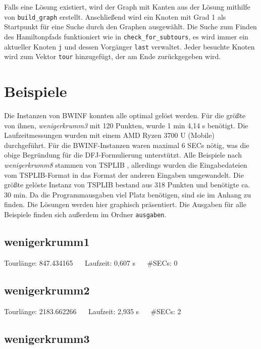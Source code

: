 \documentclass[a4paper, 10pt, ngerman]{article}
\begin{document}
Falls eine Lösung existiert, wird der Graph mit Kanten aus der Lösung mithilfe von \verb|build_graph| erstellt. Anschließend wird ein Knoten mit Grad 1 als Startpunkt für eine Suche durch den Graphen ausgewählt. Die Suche zum Finden des Hamiltonpfads funktioniert wie in \verb|check_for_subtours|, es wird immer ein aktueller Knoten \verb|j| und dessen Vorgänger \verb|last| verwaltet. Jeder besuchte Knoten wird zum Vektor \verb|tour| hinzugefügt, der am Ende zurückgegeben wird.

\section{Beispiele}

Die Instanzen von BWINF konnten alle optimal gelöst werden. Für die größte von ihnen, \emph{wenigerkrumm3} mit 120 Punkten, wurde 1 min 4,14 s benötigt. Die Laufzeitmessungen wurden mit einem AMD Ryzen 3700 U (Mobile) durchgeführt. Für die BWINF-Instanzen waren maximal 6 SECs nötig, was die obige Begründung für die DFJ-Formulierung unterstützt. Alle Beispiele nach \emph{wenigerkrumm8} stammen von TSPLIB \cite{tsplib}, allerdings wurden die Eingabedateien vom TSPLIB-Format in das Format der anderen Eingaben umgewandelt. Die größte gelöste Instanz von TSPLIB bestand aus 318 Punkten und benötigte ca. 30 min. Da die Programmausgaben viel Platz benötigen, sind sie im Anhang zu finden. Die Lösungen werden hier graphisch präsentiert. Die Ausgaben für alle Beispiele finden sich außerdem im Ordner \verb|ausgaben|.

\subsection{wenigerkrumm1}



\noindent Tourlänge: 847.434165 $\quad$ Laufzeit: 0,607 s $\quad$ \#SECs: 0

\subsection{wenigerkrumm2}



\noindent Tourlänge: 2183.662266 $\quad$ Laufzeit: 2,935 s $\quad$ \#SECs: 2

\subsection{wenigerkrumm3}
\end{document}

